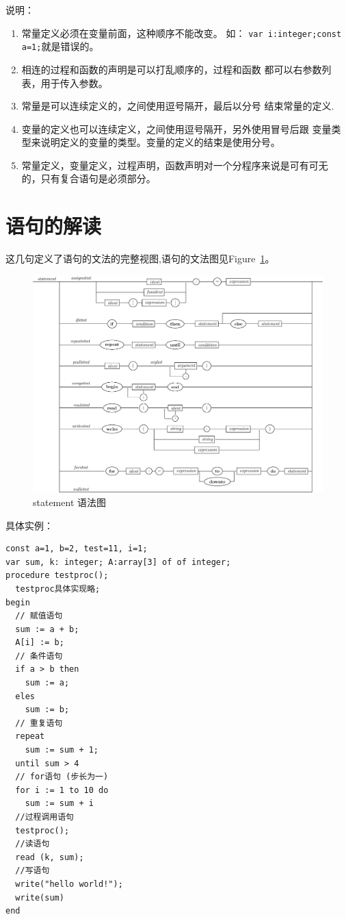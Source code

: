 说明：
\begin{enumerate}
	\item 常量定义必须在变量前面，这种顺序不能改变。
		如： \verb|var i:integer;const a=1;|就是错误的。
	\item 相连的过程和函数的声明是可以打乱顺序的，过程和函数
		都可以右参数列表，用于传入参数。
	\item 常量是可以连续定义的，之间使用逗号隔开，最后以分号
		结束常量的定义.
	\item 变量的定义也可以连续定义，之间使用逗号隔开，另外使用冒号后跟
		变量类型来说明定义的变量的类型。变量的定义的结束是使用分号。
	\item 常量定义，变量定义，过程声明，函数声明对一个分程序来说是可有可无
		的，只有复合语句是必须部分。
\end{enumerate}
\section{语句的解读}









这几句定义了语句的文法的完整视图,语句的文法图见Figure~\ref{statement}。
\begin{figure}[!h]
\begin{center}
    \includegraphics[scale=.6]{Figures/statement.eps}
\end{center}
\caption{statement 语法图}
\label{statement}
\end{figure}
具体实例：
\begin{verbatim}
const a=1, b=2, test=11, i=1;
var sum, k: integer; A:array[3] of of integer;
procedure testproc();
  testproc具体实现略;
begin
  // 赋值语句
  sum := a + b;
  A[i] := b;
  // 条件语句
  if a > b then
    sum := a;
  eles
    sum := b;
  // 重复语句
  repeat
    sum := sum + 1;
  until sum > 4
  // for语句 (步长为一)
  for i := 1 to 10 do
    sum := sum + i
  //过程调用语句
  testproc();
  //读语句
  read (k, sum);
  //写语句
  write("hello world!");
  write(sum)
end
\end{verbatim}

